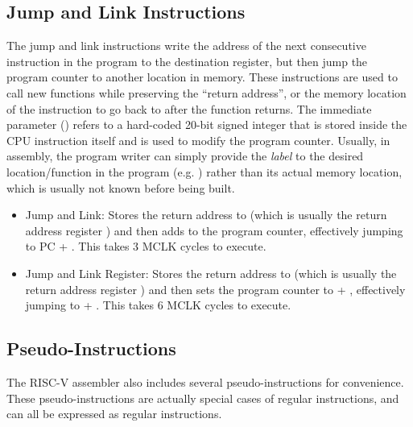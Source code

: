\documentclass[11pt,pdftex,portrait,letterpaper]{article}
\begin{document}
\subsection{Jump and Link Instructions}

The jump and link instructions write the address of the next consecutive instruction in the program to the destination register, but then jump the program counter to another location in memory. These instructions are used to call new functions while preserving the ``return address'', or the memory location of the instruction to go back to after the function returns. The immediate parameter () refers to a hard-coded 20-bit signed integer that is stored inside the CPU instruction itself and is used to modify the program counter. Usually, in assembly, the program writer can simply provide the \textit{label} to the desired location/function in the program (e.g. ) rather than its actual memory location, which is usually not known before being built.

\begin{itemize}
	\item Jump and Link:  Stores the return address to  (which is usually the return address register ) and then adds  to the program counter, effectively jumping to PC + . This takes 3 MCLK cycles to execute.
	\item Jump and Link Register:  Stores the return address to  (which is usually the return address register ) and then sets the program counter to  + , effectively jumping to  + . This takes 6 MCLK cycles to execute.
\end{itemize}

\subsection{Pseudo-Instructions}

The RISC-V assembler also includes several pseudo-instructions for convenience. These pseudo-instructions are actually special cases of regular instructions, and can all be expressed as regular instructions.
\end{document}
